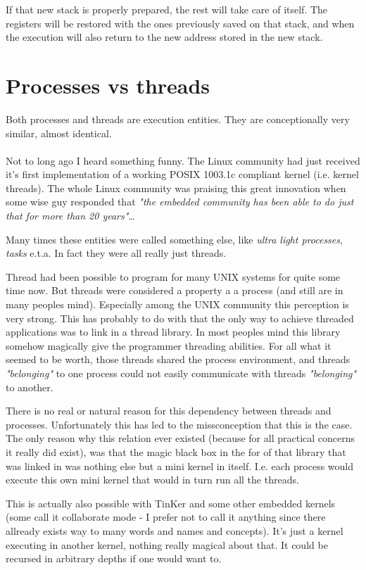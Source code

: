 			If that new stack is properly prepared, the rest will take care of itself. The registers will be restored with the ones previously saved on that stack, and when the execution will also return to the new address stored in the new stack.
			

	\section{Processes vs threads}
		Both processes and threads are execution entities. They are conceptionally very similar, almost identical.\\
		\\
		Not to long ago I heard something funny. The Linux community had just received it's first implementation of a working POSIX 1003.1c compliant kernel (i.e. kernel threads). The whole Linux community was praising this great innovation when some wise guy responded that \textit{"the embedded community has been able to do just that for more than 20 years"}\ldots

		Many times these entities were called something else, like \textit{ultra light processes}, \textit{tasks} e.t.a. In fact they were all really just threads.

		Thread had been possible to program for many UNIX systems for quite some time now. But threads were considered a property a a process (and still are in many peoples mind). Especially among the UNIX community this perception is very strong. This has probably to do with that the only way to achieve threaded applications was to link in a thread library. In most peoples mind this library somehow magically give the programmer threading abilities. For all what it seemed to be worth, those threads shared the process environment, and threads \textit{"belonging"} to one process could not easily communicate with threads \textit{"belonging"} to another.

		There is no real or natural reason for this dependency between threads and processes. Unfortunately this has led to the missconception that this is the case. The only reason why this relation ever existed (because for all practical concerns it really did exist), was that the magic black box in the for of that library that was linked in was nothing else but a mini kernel in itself. I.e. each process would execute this own mini kernel that would in turn run all the threads.

		This is actually also possible with TinKer and some other embedded kernels (some call it collaborate mode - I prefer not to call it anything since there allready exists way to many words and names and concepts). It's just a kernel executing in another kernel, nothing really magical about that. It could be recursed in arbitrary depths if one would want to.


